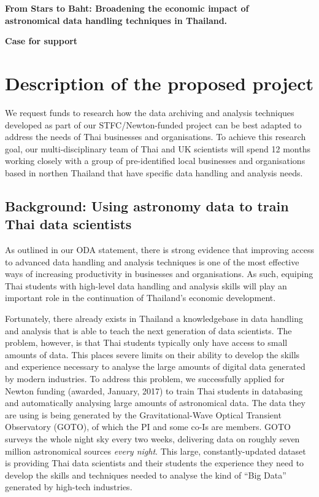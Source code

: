 \documentclass[11pt]{article}
\begin{document}
\setcounter{figure}{0}
\noindent
{\LARGE \bf From Stars to Baht: Broadening the economic impact of \\
astronomical data handling techniques in Thailand.}

\vspace{3mm}

\noindent
{\LARGE \bf Case for support}
\section{Description of the proposed project}
\noindent
We request funds to research how the data archiving and analysis techniques developed as part of our STFC/Newton-funded project can be best adapted to address the needs of Thai businesses and organisations. To achieve this research goal, our multi-disciplinary team of Thai and UK scientists will spend 12 months working closely with a group of pre-identified local businesses and organisations based in northen Thailand that have specific data handling and analysis needs.

\subsection{Background: Using astronomy data to train Thai data scientists}
As outlined in our ODA statement, there is strong evidence that improving access to advanced data handling and analysis techniques is one of the most effective ways of increasing productivity in businesses and organisations. As such, equiping Thai students with high-level data handling and analysis skills will play an important role in the continuation of Thailand's economic development.

\vspace{2mm}
\noindent
Fortunately, there already exists in Thailand a knowledgebase in data handling and analysis that is able to teach the next generation of data scientists. The problem, however, is that Thai students typically only have access to small amounts of data. This places severe limits on their ability to develop the skills and experience necessary to analyse the large amounts of digital data generated by modern industries. To address this problem, we successfully applied for Newton funding (awarded, January, 2017) to train Thai students in databasing and automatically analysing large amounts of astronomical data. The data they are using is being generated by the Gravitational-Wave Optical Transient Observatory (GOTO), of which the PI and some co-Is are members. GOTO surveys the whole night sky every two weeks, delivering data on roughly seven million astronomical sources {\it every night}. This large, constantly-updated dataset is providing Thai data scientists and their students the experience they need to develop the skills and techniques needed to analyse the kind of ``Big Data'' generated by high-tech industries.
\end{document}
